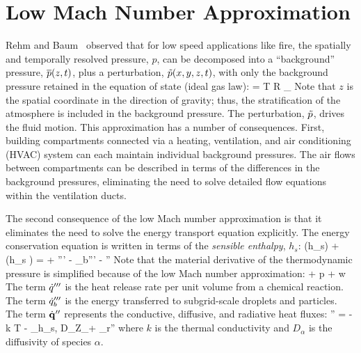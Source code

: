 \section{Low Mach Number Approximation}

Rehm and Baum~\cite{Rehm:1} observed that for low speed applications like fire, the spatially and temporally resolved pressure, $p$, can be decomposed into a ``background'' pressure, $\overline{p}(z,t)$, plus a perturbation, $\tilde{p}(x,y,z,t)$, with only the background pressure retained in the equation of state (ideal gas law):
\be \bp = \rho T {\cal R} \sum_\alpha  {} \equiv {}  \label{basicstate1} \ee
Note that $z$ is the spatial coordinate in the direction of gravity; thus, the stratification of the atmosphere is included in the background pressure. The perturbation, $\tilde{p}$, drives the fluid motion. This approximation has a number of consequences. First, building compartments connected via a heating, ventilation, and air conditioning (HVAC) system can each maintain individual background pressures. The air flows between compartments can be
described in terms of the differences in the background pressures, eliminating the need to solve detailed flow equations within the ventilation ducts.

The second consequence of the low Mach number approximation is that it eliminates the need to solve the energy transport
equation explicitly.
The energy conservation equation is written in terms of the {\em sensible enthalpy}, $h_s$:
\be {}(\rho h_s) + \nabla\!\cdot (\rho h_s \bu) =   + \dq''' - \dq_b'''
        - \nabla\!\cdot \dbq'' \label{energy} \ee
Note that the material derivative of the thermodynamic pressure is simplified because of the low Mach number approximation:
\be
    \equiv {} + \bu \cdot \nabla p \approx
    + w 
\ee
The term
$\dot{q}'''$ is the heat release rate per unit volume from a chemical reaction.
The term $\dot{q}_b'''$ is the energy transferred to subgrid-scale droplets and particles.
The term $\dot{\bf q}''$ represents the conductive, diffusive, and radiative heat fluxes:
\be \dbq'' = -k \nabla T - \sum_\alpha h_{s,\alpha} \rho D_\alpha \nabla Z_\alpha + \dbq_r'' \ee
where $k$ is the thermal conductivity and $D_\alpha$ is the diffusivity of species $\alpha$.


